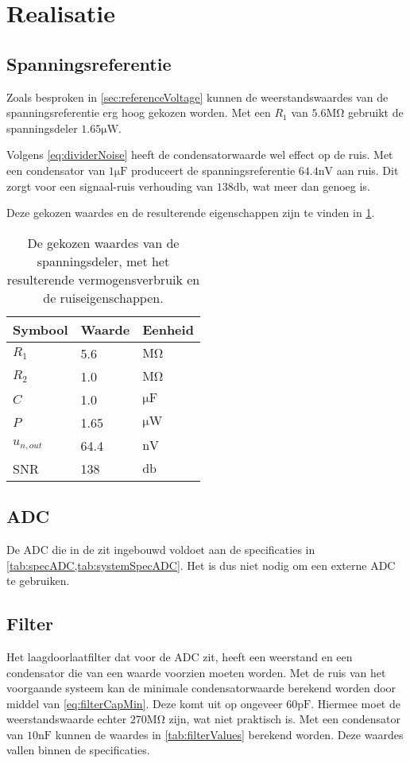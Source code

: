 \section{Realisatie}

\subsection{Spanningsreferentie}
Zoals besproken in \cref{sec:referenceVoltage} kunnen de weerstandswaardes van de spanningsreferentie erg hoog gekozen worden. Met een $R_1$ van $5.6\si{\mega\ohm}$ gebruikt de spanningsdeler $1.65\si{\micro\watt}$.

Volgens \cref{eq:dividerNoise} heeft de condensatorwaarde wel effect op de ruis. Met een condensator van $1\si{\micro\farad}$ produceert de spanningsreferentie $64.4\si{\nano\volt}$ aan ruis. Dit zorgt voor een signaal-ruis verhouding van $138\si{\decibel}$, wat meer dan genoeg is.

Deze gekozen waardes en de resulterende eigenschappen zijn te vinden in \cref{tab:divider}.

\begin{table}[ht]
\centering
\begin{tabular}{l|l|l}
    Symbool & Waarde & Eenheid \\
    \hline
    $R_1$       & 5.6  & $\si{\mega\ohm}$   \\
    $R_2$       & 1.0  & $\si{\mega\ohm}$   \\
    $C$         & 1.0  & $\si{\micro\farad}$\\
    $P$         & 1.65 & $\si{\micro\watt}$ \\
    $u_{n,out}$ & 64.4 & $\si{\nano\volt}$  \\
    SNR         & 138  & $\si{\decibel}$
\end{tabular}
\caption{De gekozen waardes van de spanningsdeler, met het resulterende vermogensverbruik en de ruiseigenschappen.}
\label{tab:divider}
\end{table}


\subsection{ADC}
De ADC die in de \mcu zit ingebouwd voldoet aan de specificaties in \cref{tab:specADC,tab:systemSpecADC}\cite{nrf52810}. Het is dus niet nodig om een externe ADC te gebruiken. 


\subsection{Filter}
Het laagdoorlaatfilter dat voor de ADC zit, heeft een weerstand en een condensator die van een waarde voorzien moeten worden.
Met de ruis van het voorgaande systeem kan de minimale condensatorwaarde berekend worden door middel van \cref{eq:filterCapMin}. Deze komt uit op ongeveer $60\si{\pico\farad}$. Hiermee moet de weerstandswaarde echter $270\si{\mega\ohm}$ zijn, wat niet praktisch is. Met een condensator van $10\si{\nano\farad}$ kunnen de waardes in \autoref{tab:filterValues} berekend worden. Deze waardes vallen binnen de specificaties.

